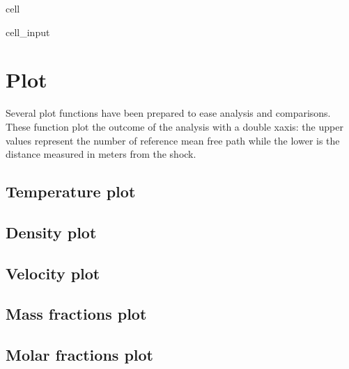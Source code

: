 \documentclass[letterpaper,10pt,english]{jupyterBook}
\begin{document}
\begin{sphinxuseclass}{cell}
\begin{sphinxVerbatimInput}
\begin{sphinxuseclass}{cell_input}
\begin{sphinxVerbatim}[commandchars=\\\{\}]
      
      
      
    
  
\end{sphinxVerbatim}

\end{sphinxuseclass}\end{sphinxVerbatimInput}

\end{sphinxuseclass}

\section{Plot}
\label{\detokenize{2_Temperature/_2T_Problem_class_definition:plot}}
\sphinxAtStartPar
Several plot functions have been prepared to ease analysis and comparisons. These function plot the outcome of the analysis with a double x\sphinxhyphen{}axis: the upper values represent the number of reference mean free path while the lower is the distance measured in meters from the shock.


\subsection{Temperature plot}
\label{\detokenize{2_Temperature/_2T_Problem_class_definition:temperature-plot}}

\subsection{Density plot}
\label{\detokenize{2_Temperature/_2T_Problem_class_definition:density-plot}}

\subsection{Velocity plot}
\label{\detokenize{2_Temperature/_2T_Problem_class_definition:velocity-plot}}

\subsection{Mass fractions plot}
\label{\detokenize{2_Temperature/_2T_Problem_class_definition:mass-fractions-plot}}

\subsection{Molar fractions plot}
\label{\detokenize{2_Temperature/_2T_Problem_class_definition:molar-fractions-plot}}
\end{document}
